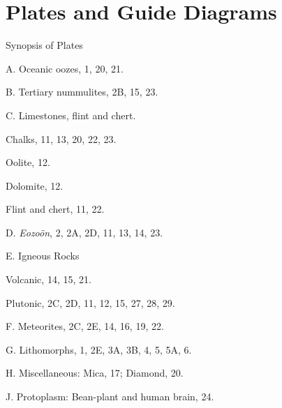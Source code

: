 \documentclass[a4paper, 12pt, oneside]{article}
\begin{document}
\section{Plates and Guide Diagrams}
\centerline{Synopsis of Plates}
\bigskip
\begin{description}
    \item A. Oceanic oozes, 1, 20, 21.
    \item B. Tertiary nummulites, 2B, 15, 23.
    \item C. Limestones, flint and chert.
    \item\hspace{15mm}Chalks, 11, 13, 20, 22, 23.
    \item\hspace{15mm}Oolite, 12.
    \item\hspace{15mm}Dolomite, 12.
    \item\hspace{15mm}Flint and chert, 11, 22.
    \item D. \emph{Eozoön}, 2, 2A, 2D, 11, 13, 14, 23.
    \item E. Igneous Rocks
    \item\hspace{15mm}Volcanic, 14, 15, 21.
    \item\hspace{15mm}Plutonic, 2C, 2D, 11, 12, 15, 27, 28, 29.
    \item F. Meteorites, 2C, 2E, 14, 16, 19, 22.
    \item G. Lithomorphs, 1, 2E, 3A, 3B, 4, 5, 5A, 6.
    \item H. Miscellaneous: Mica, 17; Diamond, 20.
    \item J. Protoplasm: Bean-plant and human brain, 24.
\end{description}
\end{document}
